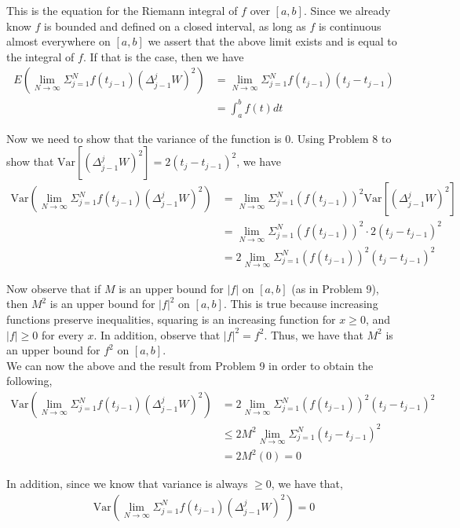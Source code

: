 \documentclass[12pt]{article}
\begin{document}
This is the equation for the Riemann integral of $f$ over $[a,b]$. Since we already know $f$ is bounded and defined on a closed interval, as long as $f$ is continuous almost everywhere on $[a,b]$ we assert that the above limit exists and is equal to the integral of $f$. If that is the case, then we have
\begin{align*}
E(\lim_{N \to \infty} \Sigma^N_{j=1} f(t_{j-1}) (\Delta_{j-1}^j W)^2) &= \lim_{N \to \infty} \Sigma^N_{j=1} f(t_{j-1})(t_j - t_{j-1})\\
&= \int_a^b f(t) dt
\end{align*}

Now we need to show that the variance of the function is 0. Using Problem 8 to show that $\text{Var}[(\Delta_{j-1}^j W)^2] = 2(t_j - t_{j-1})^2$, we have
\begin{align*}
\text{Var}(\lim_{N \to \infty} \Sigma^N_{j=1} f(t_{j-1}) (\Delta_{j-1}^j W)^2) &= \lim_{N \to \infty} \Sigma^N_{j=1} (f(t_{j-1}))^2 \text{Var}[(\Delta_{j-1}^j W)^2]\\
&= \lim_{N \to \infty} \Sigma^N_{j=1} (f(t_{j-1}))^2 \cdot 2(t_j - t_{j-1})^2\\
&= 2\lim_{N \to \infty} \Sigma^N_{j=1} (f(t_{j-1}))^2 (t_j - t_{j-1})^2
\end{align*}

Now observe that if $M$ is an upper bound for $|f|$ on $[a,b]$ (as in Problem 9), then $M^2$ is an upper bound for $|f|^2$ on $[a,b]$. This is true because increasing functions preserve inequalities, squaring is an increasing function for $x \geq 0$, and $|f| \geq 0$ for every $x$. In addition, observe that $|f|^2 = f^2$. Thus, we have that $M^2$ is an upper bound for $f^2$ on $[a,b]$.\\

We can now the above and the result from Problem 9 in order to obtain the following,
\begin{align*}
\text{Var}(\lim_{N \to \infty} \Sigma^N_{j=1} f(t_{j-1}) (\Delta_{j-1}^j W)^2) &= 2\lim_{N \to \infty} \Sigma^N_{j=1} (f(t_{j-1}))^2 (t_j - t_{j-1})^2\\
&\leq 2M^2 \lim_{N \to \infty} \Sigma^N_{j=1} (t_j - t_{j-1})^2\\
&= 2M^2(0) = 0
\end{align*}

In addition, since we know that variance is always $\geq 0$, we have that,
\begin{align*}
\text{Var}(\lim_{N \to \infty} \Sigma^N_{j=1} f(t_{j-1}) (\Delta_{j-1}^j W)^2) = 0
\end{align*}
\end{document}
